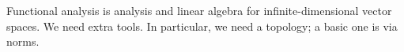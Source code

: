 

Functional analysis is analysis
and linear algebra for infinite-dimensional
vector spaces. We need extra tools.
In particular, we need a topology;
a basic one is via norms.
